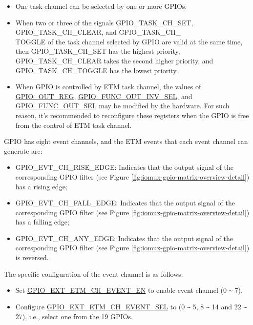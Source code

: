 \documentclass[main\_\_EN.tex]{subfiles}
\begin{document}
\begin{tiplisting}
\vspace{-2em}
\begin{itemize}
\item One task channel can be selected by one or more GPIOs.

\item When two or three of the signals GPIO\_TASK\_CH\_SET, GPIO\_TASK\_CH\_CLEAR, and GPIO\_TASK\_CH\_\\TOGGLE of the task channel   selected by GPIO are valid at the same time, then GPIO\_TASK\_CH\_SET has the highest priority, GPIO\_TASK\_CH\_CLEAR takes the second higher priority, and GPIO\_TASK\_CH\_TOGGLE has the lowest priority.

\item When GPIO is controlled by ETM task channel, the values of \hyperref[regdesc:GPIOOUTREG]{GPIO\_OUT\_REG}, \hyperref[fielddesc:GPIOFUNCNOUTINVSEL]{GPIO\_FUNC\_OUT\_INV\_SEL}, and \hyperref[fielddesc:GPIOFUNCNOUTSEL]{GPIO\_FUNC\_OUT\_SEL} may be modified by the hardware. For such reason, it's recommended to reconfigure these registers when the GPIO is free from the control of ETM task channel.
\end{itemize}
\end{tiplisting}

GPIO has eight event channels, and the ETM events that each event channel can generate are:

\begin{itemize}
    \item GPIO\_EVT\_CH\_RISE\_EDGE: Indicates that the output signal of the corresponding GPIO filter (see Figure \ref{fig:iomux-gpio-matrix-overview-detail}) has a rising edge;
    \item GPIO\_EVT\_CH\_FALL\_EDGE: Indicates that the output signal of the corresponding GPIO filter (see Figure \ref{fig:iomux-gpio-matrix-overview-detail}) has a falling edge;
    \item GPIO\_EVT\_CH\_ANY\_EDGE: Indicates that the output signal of the corresponding GPIO filter (see Figure \ref{fig:iomux-gpio-matrix-overview-detail}) is reversed.
\end{itemize}

The specific configuration of the event channel is as follows:

\begin{itemize}
    \item Set  \hyperref[fielddesc:GPIOSDETMCH0EVENTEN]{GPIO\_EXT\_ETM\_CH\_EVENT\_EN} to enable event channel  (0 \verb+~+ 7).
    \item Configure \hyperref[fielddesc:GPIOSDETMCH0EVENTSEL]{GPIO\_EXT\_ETM\_CH\_EVENT\_SEL} to  (0 \verb+~+ 5, 8 \verb+~+ 14 and 22 \verb+~+ 27), i.e., select one from the 19 GPIOs.
\end{itemize}
\end{document}
